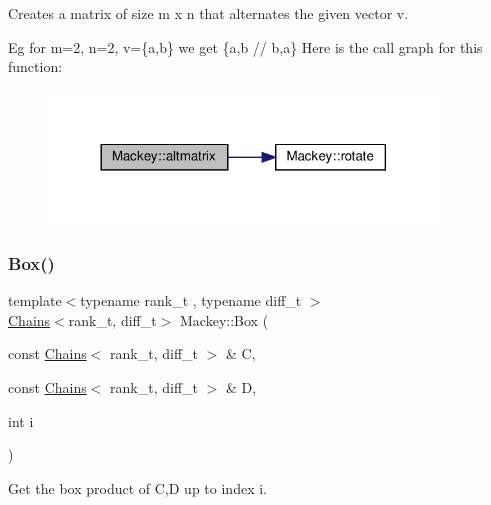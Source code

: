 Creates a matrix of size m x n that alternates the given vector v. 

Eg for m=2, n=2, v=\{a,b\} we get \{a,b // b,a\} Here is the call graph for this function\+:\nopagebreak
\begin{figure}[H]
\begin{center}
\leavevmode
\includegraphics[width=293pt]{namespaceMackey_a26a529f63caac9c5b4dc809e0e5831be_cgraph}
\end{center}
\end{figure}
\mbox{\label{namespaceMackey_add5b60c8e734df2be261106e0c719f82}} 
\subsubsection{\texorpdfstring{Box()}{Box()}\hspace{0.1cm}{\footnotesize\ttfamily [1/2]}}
{\footnotesize\ttfamily template$<$typename rank\+\_\+t , typename diff\+\_\+t $>$ \\
\hyperlink{classMackey_1_1Chains}{Chains}$<$rank\+\_\+t, diff\+\_\+t$>$ Mackey\+::\+Box (\begin{DoxyParamCaption}\item[{const \hyperlink{classMackey_1_1Chains}{Chains}$<$ rank\+\_\+t, diff\+\_\+t $>$ \&}]{C,  }\item[{const \hyperlink{classMackey_1_1Chains}{Chains}$<$ rank\+\_\+t, diff\+\_\+t $>$ \&}]{D,  }\item[{int}]{i }\end{DoxyParamCaption})}



Get the box product of C,D up to index i. 

\mbox{\label{namespaceMackey_a72abbe3708c4e77936c8cc42fbc6753a}} 
